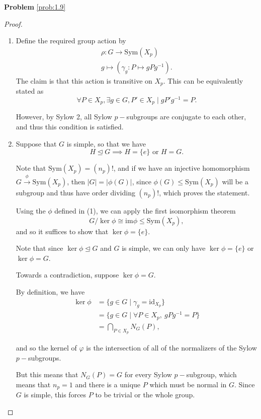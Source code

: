 \textbf{Problem} \ref{prob:1.9}
\begin{proof}
\begin{enumerate}
    \item Define the required group action by
    \begin{align*}
        \rho: G \to \mathrm{Sym}(X_p) \\
        g \mapsto (\gamma_g: P \mapsto gPg^{-1}).
    \end{align*}
    The claim is that this action is transitive on $X_p$. This can be equivalently stated as 
    \[
    \forall P \in X_p, \exists g \in G, P' \in X_p \mid gP'g^{-1} = P.
    \]
    
    However, by Sylow 2, all Sylow $p-$subgroups are conjugate to each other, and thus this condition is satisfied.
    
    \item Suppose that $G$ is simple, so that we have
    \[
    H \trianglelefteq G \implies H = \{ e \} \text{ or } H = G.
    \]
    
    Note that $\mathrm{Sym}(X_p) = (n_p)!$, and if we have an injective homomorphism $G \xrightarrow{\phi} \mathrm{Sym}(X_p)$, then $|G| = |\phi(G)|$, since $\phi(G) \leq \mathrm{Sym}(X_p)$ will be a subgroup and thus have order dividing $(n_p)!$, which proves the statement.
    
    Using the $\phi$ defined in (1), we can apply the first isomorphism theorem
    \[
    G / \ker \phi \cong \mathrm{im} \phi \leq \mathrm{Sym}(X_p),
    \]
    and so it suffices to show that $\ker \phi = \{e\}$.
    
    Note that since $\ker \phi \trianglelefteq G$ and $G$ is simple, we can only have $\ker \phi = \{e\}$ or $\ker \phi = G$.
    
    Towards a contradiction, suppose $\ker \phi = G$.
    
    By definition, we have
    \begin{align*}
    \ker \phi &= \{ g\in G \mid \gamma_g = \mathrm{id}_{X_p} \} \\
    &= \{ g\in G \mid \forall P \in X_p,~ gPg^{-1} = P \} \\
    &= \bigcap_{P \in X_p} N_G(P),
    \end{align*}
    
    and so the kernel of $\varphi$ is the intersection of all of the normalizers of the Sylow $p-$subgroups.
    
    But this means that $N_G(P) = G$ for every Sylow $p-$subgroup, which means that $n_p = 1$ and there is a unique $P$ which must be normal in $G$. Since $G$ is simple, this forces $P$ to be trivial or the whole group.
    

\end{enumerate}
\end{proof}

